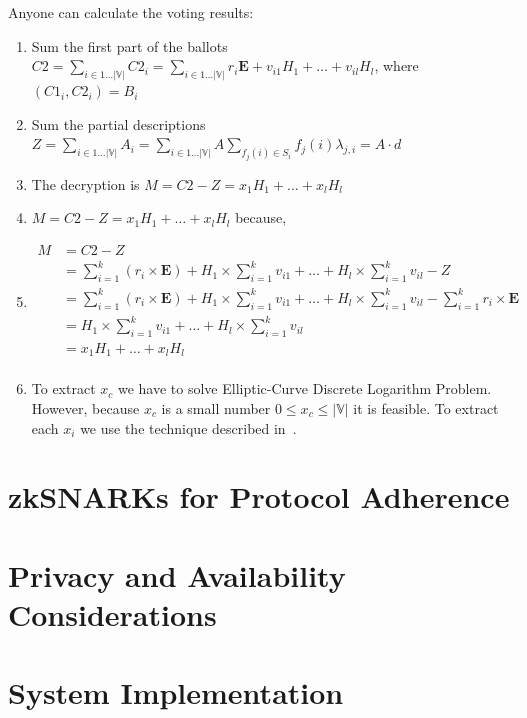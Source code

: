 \documentclass{article}
\begin{document}
Anyone can calculate the voting results:
\begin{enumerate}
    \item Sum the first part of the ballots $C2 = \sum_{i \in 1 \dots |\mathbb{V}|} C2_i = \sum_{i \in 1 \dots |\mathbb{V}|} r_i \mathbf{E} + v_{i1} H_1 + \dots + v_{il} H_l$, where $(C1_i,C2_i)=B_i$
    \item Sum the partial descriptions $Z=\sum_{i \in 1 \dots |\mathbb{V}|} A_i = \sum_{i \in 1 \dots |\mathbb{V}|} A \sum_{f_j(i) \in S_i} f_j(i) \lambda_{j,i} = A \cdot d$
    \item The decryption is $M=C2-Z=x_1 H_1 + \dots + x_l H_l$
    \item $M=C2-Z=x_1 H_1 + \dots + x_l H_l$ because,
    \item $\begin{aligned} M&=C2-Z \\
        &= \sum_{i=1}^k ( r_{i} \times \mathbf{E}) + H_1 \times \sum_{i=1}^k v_{i1} + \dots + H_l \times \sum_{i=1}^k v_{il} - Z\\
        &= \sum_{i=1}^k ( r_{i} \times \mathbf{E}) + H_1 \times \sum_{i=1}^k v_{i1} + \dots + H_l \times \sum_{i=1}^k v_{il} - \sum_{i=1}^k r_{i} \times \mathbf{E}\\
        &= H_1 \times \sum_{i=1}^k v_{i1} + \dots + H_l \times \sum_{i=1}^k v_{il}\\
        &= x_1 H_1 + \dots + x_l H_l\\
        \end{aligned}$
    \item To extract $x_c$ we have to solve Elliptic-Curve Discrete Logarithm Problem. However, because $x_c$ is a small number $0 \leq x_c \leq |\mathbb{V}|$ it is feasible. To extract each $x_i$ we use the technique described in~\cite{haoAnonymousVotingTworound2010}.
\end{enumerate}

\section{zkSNARKs for Protocol Adherence}

\section{Privacy and Availability Considerations}

\section{System Implementation}
\end{document}
